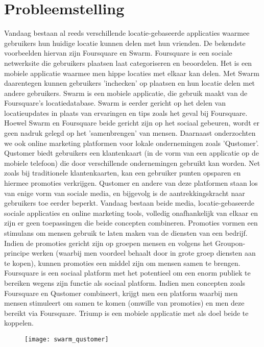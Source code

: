 \chapter{Probleemstelling}
Vandaag bestaan al reeds verschillende locatie-gebaseerde applicaties waarmee gebruikers hun huidige locatie kunnen delen met hun vrienden. De bekendste voorbeelden hiervan zijn Foursquare en Swarm. Foursquare is een sociale netwerksite die gebruikers plaatsen laat categoriseren en beoordelen. Het is een mobiele applicatie waarmee men hippe locaties met elkaar kan delen. Met Swarm daarentegen kunnen gebruikers 'inchecken' op plaatsen en hun locatie delen met andere gebruikers. Swarm is een mobiele applicatie, die gebruik maakt van de Foursquare's locatiedatabase. Swarm is eerder gericht op het delen van locatieupdates in plaats van ervaringen en tips zoals het geval bij Foursquare.
Hoewel Swarm en Foursquare beide gericht zijn op het sociaal gebeuren, wordt er geen nadruk gelegd op het 'samenbrengen' van mensen. 
Daarnaast onderzochten we ook online marketing platformen voor lokale ondernemingen zoals 'Qustomer'. Qustomer biedt gebruikers een klantenkaart (in de vorm van een applicatie op de mobiele telefoon) die door verschillende ondernemingen gebruikt kan worden. Net zoals bij traditionele klantenkaarten, kan een gebruiker punten opsparen en hiermee promoties verkrijgen. Qustomer en andere van deze platformen staan los van enige vorm van sociale media, en bijgevolg is de aantrekkingskracht naar gebruikers toe eerder beperkt.
Vandaag bestaan beide media, locatie-gebaseerde sociale applicaties en online marketing tools, volledig onafhankelijk van elkaar en zijn er geen toepassingen die beide concepten combineren. 
Promoties vormen een stimulans om mensen gebruik te laten maken van de diensten van een bedrijf. Indien de promoties gericht zijn op groepen mensen en volgens het Groupon-principe werken (waarbij men voordeel behaalt door in grote groep diensten aan te kopen), kunnen promoties een middel zijn om mensen samen te brengen.
Foursquare is een sociaal platform met het potentieel om een enorm publiek te bereiken wegens zijn functie als sociaal platform.
Indien men concepten zoals Foursquare en Qustomer combineert, krijgt men een platform waarbij men mensen stimuleert om samen te komen (omwille van promoties) en men deze bereikt via Foursquare.
Triump is een mobiele applicatie met als doel beide te koppelen. 
\begin{figure}[H]
	\centering
	\texttt{[image: swarm\_qustomer]}
	\label{fig:probleemstelling}
	
\end{figure}


